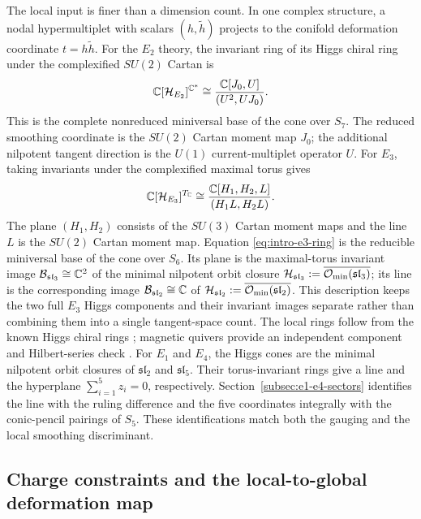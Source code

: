 The local input is finer than a dimension count. In one complex structure, a
nodal hypermultiplet with scalars $(h,\widetilde h)$ projects to the conifold
deformation coordinate $t=h\widetilde h$. For the $E_2$ theory, the invariant
ring of its Higgs chiral ring under the complexified $SU(2)$ Cartan is
\begin{equation}
 \mathbb C[\mathcal H_{E_2}]^{\mathbb C^*}
 \cong \frac{\mathbb C[J_0,U]}{(U^2,UJ_0)} .
 \label{eq:intro-e2-ring}
\end{equation}
This is the complete nonreduced miniversal base of the cone over $S_7$.
The reduced smoothing coordinate is the $SU(2)$ Cartan moment map $J_0$; the
additional nilpotent tangent direction is the $U(1)$ current-multiplet
operator $U$. For
$E_3$, taking invariants under the complexified maximal torus gives
\begin{equation}
 \mathbb C[\mathcal H_{E_3}]^{T_{\mathbb C}}
 \cong
 \frac{\mathbb C[H_1,H_2,L]}{(H_1L,H_2L)} .
 \label{eq:intro-e3-ring}
\end{equation}
The plane $(H_1,H_2)$ consists of the $SU(3)$ Cartan moment maps and the line
$L$ is the $SU(2)$ Cartan moment map. Equation
\eqref{eq:intro-e3-ring} is the reducible miniversal base of the cone over
$S_6$. Its plane is the maximal-torus invariant image
$\mathcal B_{\mathfrak{sl}_3}\cong\mathbb C^2$ of the minimal nilpotent orbit closure
$\mathcal H_{\mathfrak{sl}_3}:=\overline{\mathcal O_{\min}(\mathfrak{sl}_3)}$;
its line is the corresponding image $\mathcal B_{\mathfrak{sl}_2}\cong\mathbb C$ of
$\mathcal H_{\mathfrak{sl}_2}:=\overline{\mathcal O_{\min}(\mathfrak{sl}_2)}$.
This description keeps the two full $E_3$ Higgs components and their
invariant images separate rather than combining them into a single
tangent-space count. The local rings follow from
the known Higgs chiral rings
\cite{Cremonesi:2015lsa}; magnetic quivers provide an independent component
and Hilbert-series check \cite{Ferlito:2016,Cabrera:2018,Closset:2020afy}.
For $E_1$ and $E_4$, the Higgs cones are the minimal nilpotent orbit
closures of $\mathfrak{sl}_2$ and $\mathfrak{sl}_5$. Their torus-invariant
rings give a line and the hyperplane $\sum_{i=1}^5z_i=0$, respectively.
Section~\ref{subsec:e1-e4-sectors} identifies the line with the ruling
difference and the five coordinates integrally with the conic-pencil
pairings of $S_5$. These identifications match both the gauging and the
local smoothing discriminant.

\subsection*{Charge constraints and the local-to-global deformation map}

